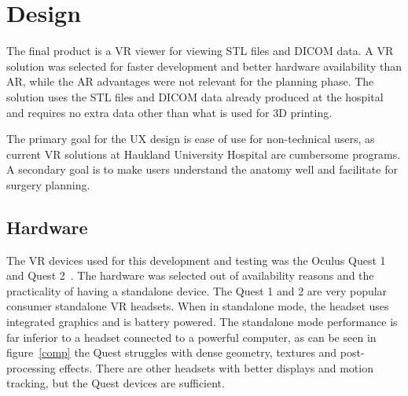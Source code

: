 \documentclass[a4paper]{report}
\begin{document}
\section{Design}


The final product is a VR viewer for viewing STL files and DICOM data. A VR solution was selected for faster development and better hardware availability than AR, while the AR advantages were not relevant for the planning phase.
The solution uses the STL files and DICOM data already produced at the hospital and requires no extra data other than what is used for 3D printing.

The primary goal for the UX design is ease of use for non-technical users, as current VR solutions at Haukland University Hospital are cumbersome programs.
A secondary goal is to make users understand the anatomy well and facilitate for surgery planning.

\subsection{Hardware}
The VR devices used for this development and testing was the Oculus Quest 1 and Quest 2~\cite{noauthor_oculus_nodate}. The hardware was selected out of availability reasons and the practicality of having a standalone device.
The Quest 1 and 2 are very popular consumer standalone VR headsets. When in standalone mode, the headset uses integrated graphics and is battery powered. The standalone mode performance is far inferior to a headset connected to a powerful computer, as can be seen in figure~\ref{comp} the Quest struggles with dense geometry, textures and post-processing effects.
There are other headsets with better displays and motion tracking, but the Quest devices are sufficient.
\end{document}
